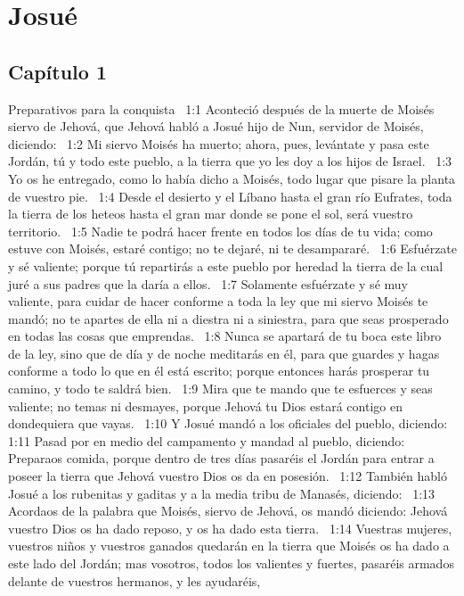 
\chapter{Josué}


\section*{Capítulo 1 }
Preparativos para la conquista  
1:1 Aconteció después de la muerte de Moisés siervo de Jehová, que Jehová habló a Josué hijo de Nun, servidor de Moisés, diciendo:  
1:2 Mi siervo Moisés ha muerto; ahora, pues, levántate y pasa este Jordán, tú y todo este pueblo, a la tierra que yo les doy a los hijos de Israel.  
1:3 Yo os he entregado, como lo había dicho a Moisés, todo lugar que pisare la planta de vuestro pie.  
1:4 Desde el desierto y el Líbano hasta el gran río Eufrates, toda la tierra de los heteos hasta el gran mar donde se pone el sol, será vuestro territorio.  
1:5 Nadie te podrá hacer frente en todos los días de tu vida; como estuve con Moisés, estaré contigo; no te dejaré, ni te desampararé.  
1:6 Esfuérzate y sé valiente; porque tú repartirás a este pueblo por heredad la tierra de la cual juré a sus padres que la daría a ellos.  
1:7 Solamente esfuérzate y sé muy valiente, para cuidar de hacer conforme a toda la ley que mi siervo Moisés te mandó; no te apartes de ella ni a diestra ni a siniestra, para que seas prosperado en todas las cosas que emprendas.  
1:8 Nunca se apartará de tu boca este libro de la ley, sino que de día y de noche meditarás en él, para que guardes y hagas conforme a todo lo que en él está escrito; porque entonces harás prosperar tu camino, y todo te saldrá bien.  
1:9 Mira que te mando que te esfuerces y seas valiente; no temas ni desmayes, porque Jehová tu Dios estará contigo en dondequiera que vayas.  
1:10 Y Josué mandó a los oficiales del pueblo, diciendo:  
1:11 Pasad por en medio del campamento y mandad al pueblo, diciendo: Preparaos comida, porque dentro de tres días pasaréis el Jordán para entrar a poseer la tierra que Jehová vuestro Dios os da en posesión.  
1:12 También habló Josué a los rubenitas y gaditas y a la media tribu de Manasés, diciendo:  
1:13 Acordaos de la palabra que Moisés, siervo de Jehová, os mandó diciendo: Jehová vuestro Dios os ha dado reposo, y os ha dado esta tierra.  
1:14 Vuestras mujeres, vuestros niños y vuestros ganados quedarán en la tierra que Moisés os ha dado a este lado del Jordán; mas vosotros, todos los valientes y fuertes, pasaréis armados delante de vuestros hermanos, y les ayudaréis,  
